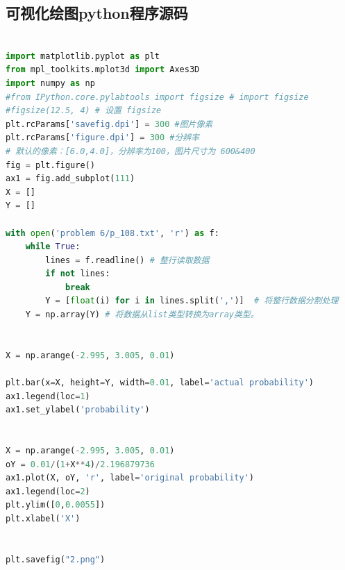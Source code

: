 \documentclass[a4paper,11pt]{article}
\begin{document}
\begin{appendices}
\newpage

\section{可视化绘图python程序源码}

\begin{lstlisting}[language = python]

import matplotlib.pyplot as plt
from mpl_toolkits.mplot3d import Axes3D
import numpy as np
#from IPython.core.pylabtools import figsize # import figsize
#figsize(12.5, 4) # 设置 figsize
plt.rcParams['savefig.dpi'] = 300 #图片像素
plt.rcParams['figure.dpi'] = 300 #分辨率
# 默认的像素：[6.0,4.0]，分辨率为100，图片尺寸为 600&400
fig = plt.figure()
ax1 = fig.add_subplot(111)
X = []
Y = []

with open('problem 6/p_108.txt', 'r') as f:
    while True:
        lines = f.readline() # 整行读取数据
        if not lines:
            break
        Y = [float(i) for i in lines.split(',')]  # 将整行数据分割处理
    Y = np.array(Y) # 将数据从list类型转换为array类型。


X = np.arange(-2.995, 3.005, 0.01)

plt.bar(x=X, height=Y, width=0.01, label='actual probability')
ax1.legend(loc=1)
ax1.set_ylabel('probability')


X = np.arange(-2.995, 3.005, 0.01)
oY = 0.01/(1+X**4)/2.196879736
ax1.plot(X, oY, 'r', label='original probability')
ax1.legend(loc=2)
plt.ylim([0,0.0055])
plt.xlabel('X')


plt.savefig("2.png")

\end{lstlisting}


\end{appendices}
\end{document}
